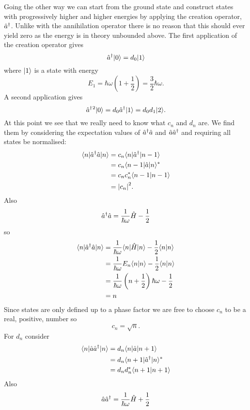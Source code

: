     Going the other way we can start from the ground state and construct states with progressively higher and higher energies by applying the creation operator, \(\hat{a}^\dagger\).
    Unlike with the annihilation operator there is no reason that this should ever yield zero as the energy is in theory unbounded above.
    The first application of the creation operator gives
    \[\hat{a}^\dagger \vert {0} \rangle = d_0\vert {1} \rangle\]
    where \(\vert {1} \rangle\) is a state with energy
    \[E_1 = \hbar\omega\left(1 + \frac{1}{2}\right) = \frac{3}{2}\hbar\omega.\]
    A second application gives
    \[\hat{a}^\dagger{^2}\vert {0} \rangle = d_0\hat{a}^\dagger\vert {1} \rangle = d_0d_1\vert {2} \rangle.\]
    At this point we see that we really need to know what \(c_n\) and \(d_n\) are.
    We find them by considering the expectation values of \(\hat{a}^\dagger\hat{a}\) and \(\hat{a}\hat{a}^\dagger\) and requiring all states be normalised:
    \begin{align*}
        \langle {n} \vert\hat{a}^\dagger\hat{a}\vert {n} \rangle &= c_n\langle {n} \vert\hat{a}^\dagger\vert {n - 1} \rangle\\
        &= c_n\langle {n-1} \vert\hat{a}\vert {n} \rangle^*\\
        &= c_nc_n^*\langle {n-1} \vert {n-1} \rangle\\
        &= \abs{c_n}^2.
    \end{align*}
    Also
    \[\hat{a}^\dagger\hat{a} = \frac{1}{\hbar\omega}\hat{H} - \frac{1}{2}\]
    so
    \begin{align*}
        \langle {n} \vert\hat{a}^\dagger\hat{a}\vert {n} \rangle &= \frac{1}{\hbar\omega}\langle {n} \vert\hat{H}\vert {n} \rangle - \frac{1}{2}\langle {n} \vert {n} \rangle\\
        &= \frac{1}{\hbar\omega}E_n\langle {n} \vert {n} \rangle - \frac{1}{2}\langle {n} \vert {n} \rangle\\
        &= \frac{1}{\hbar\omega}\left(n + \frac{1}{2}\right)\hbar\omega  - \frac{1}{2}\\
        &= n
    \end{align*}
    Since states are only defined up to a phase factor we are free to choose \(c_n\) to be a real, positive, number so
    \[c_n = \sqrt{n}.\]
    For \(d_n\) consider
    \begin{align*}
        \langle {n} \vert\hat{a}\hat{a}^\dagger\vert {n} \rangle &= d_n \langle {n} \vert\hat{a}\vert {n + 1} \rangle\\
        &= d_n\langle {n + 1} \vert\hat{a}^\dagger\vert {n} \rangle^*\\
        &= d_nd_n^*\langle {n + 1} \vert {n + 1} \rangle
    \end{align*}
    Also
    \[\hat{a}\hat{a}^\dagger = \frac{1}{\hbar\omega}\hat{H} + \frac{1}{2}\]
